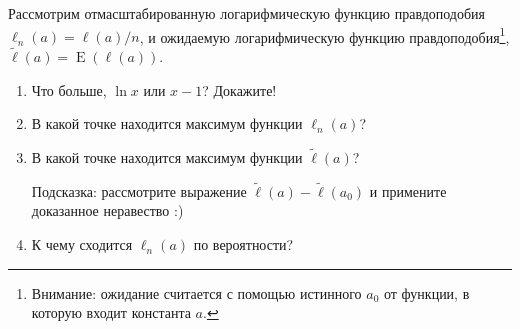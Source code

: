 \documentclass[12pt]{article}
\DeclareMathOperator{\E}{E}
\begin{document}
\begin{enumerate}
Рассмотрим отмасштабированную логарифмическую функцию правдоподобия $\ell_n(a)=\ell(a) / n$, и
ожидаемую логарифмическую функцию правдоподобия\footnote{Внимание:
ожидание считается с помощью истинного $a_0$ от функции, в которую входит константа $a$.},
$\tilde \ell(a)=\E(\ell(a))$.
\begin{enumerate}
\item Что больше, $\ln x$ или $x-1$? Докажите!
\item В какой точке находится максимум функции $\ell_n(a)$?
\item В какой точке находится максимум функции $\tilde \ell(a)$?

Подсказка: рассмотрите выражение $\tilde \ell(a) - \tilde \ell(a_0)$ и примените доказанное неравество :)
\item К чему сходится $\ell_n(a)$ по вероятности?

\end{enumerate}


\end{enumerate}
\end{document}
